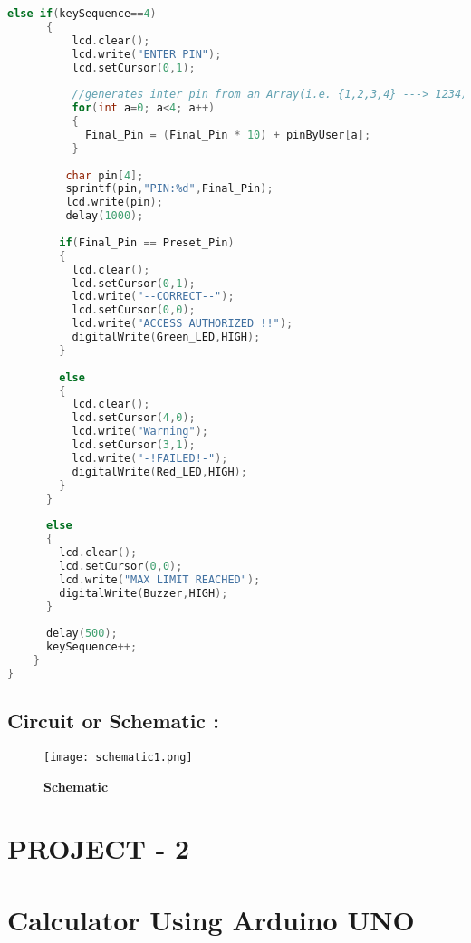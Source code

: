 \documentclass[12pt]{article}
\begin{document}
\begin{lstlisting}[language=C]
      else if(keySequence==4)
      {
          lcd.clear();
          lcd.write("ENTER PIN");                  
          lcd.setCursor(0,1);
          
          //generates inter pin from an Array(i.e. {1,2,3,4} ---> 1234)
          for(int a=0; a<4; a++)  
          {
            Final_Pin = (Final_Pin * 10) + pinByUser[a]; 
          } 
                  
         char pin[4];
         sprintf(pin,"PIN:%d",Final_Pin);
         lcd.write(pin);
         delay(1000);
        
        if(Final_Pin == Preset_Pin)
        {
          lcd.clear();
          lcd.setCursor(0,1);
          lcd.write("--CORRECT--"); 
          lcd.setCursor(0,0);
          lcd.write("ACCESS AUTHORIZED !!"); 
          digitalWrite(Green_LED,HIGH);
        }
             
        else 
        {
          lcd.clear();
          lcd.setCursor(4,0);
          lcd.write("Warning");          
          lcd.setCursor(3,1);
          lcd.write("-!FAILED!-"); 
          digitalWrite(Red_LED,HIGH);
        }            
      }
      
      else 
      {
        lcd.clear();
        lcd.setCursor(0,0);
        lcd.write("MAX LIMIT REACHED");
        digitalWrite(Buzzer,HIGH); 
      }
      
      delay(500);
      keySequence++;
    }         
}
 \end{lstlisting}
 
 \pagebreak
 
  \subsection*{\textbf{Circuit or Schematic :}}
 
  \begin{figure}[h]
\centering
\texttt{[image: schematic1.png]}
\caption{\textbf{Schematic}}
\label{schematic_diagram1}
\end{figure}
 
\pagebreak

\begin{center}
\section*{PROJECT - 2}
\section*{\textbf{Calculator Using Arduino UNO}}
\end{center}
\end{document}
